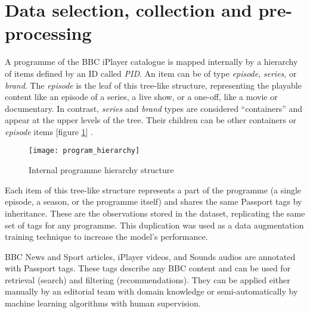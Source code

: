 
\section{Data selection, collection and pre-processing}


A programme of the BBC iPlayer catalogue is mapped internally by a hierarchy of items defined by an ID called \textit{PID}.
An item can be of type \textit{episode}, \textit{series}, or \textit{brand}. The \textit{episode} is the leaf of this tree-like structure,
representing the playable content like an episode of a series, a live show, or a one-off, like a movie or documentary.
In contrast, \textit{series} and \textit{brand} types are considered ``containers'' and appear at the upper levels of the tree.
Their children can be other containers or \textit{episode} items [figure \ref{fig:program_hierarchy}] \cite{BBC:ProgrammePages,BBC:ProgrammeUrlStructure}.

\begin{figure}[h]
  \centering
  \texttt{[image: program\_hierarchy]}
  \caption{Internal programme hierarchy structure}
  \label{fig:program_hierarchy}
\end{figure}

Each item of this tree-like structure represents a part of the programme
(a single episode, a season, or the programme itself) and shares the same Passport tags by inheritance.
These are the observations stored in the dataset, replicating the same set of tags for any programme.
This duplication was used as a data augmentation training technique to increase the model's performance.

BBC News and Sport articles, iPlayer videos, and Sounds audios are annotated with Passport tags.
These tags describe any BBC content and can be used for retrieval (search) and filtering (recommendations).
They can be applied either manually by an editorial team with domain knowledge
or semi-automatically by machine learning algorithms with human supervision.


